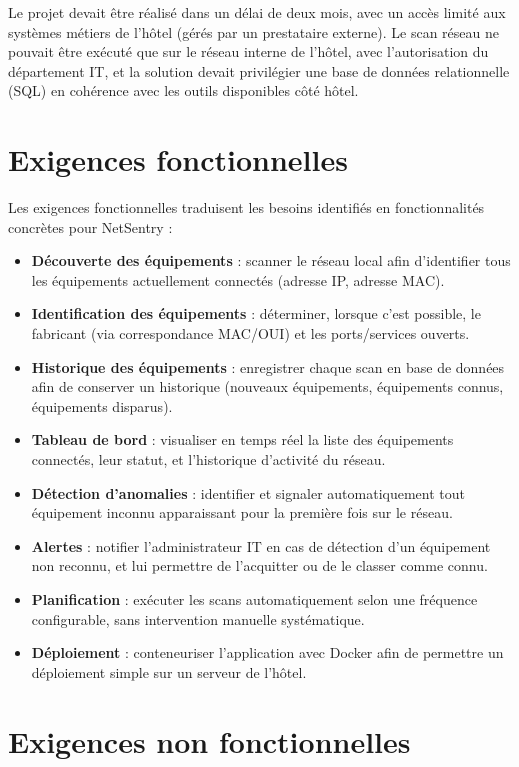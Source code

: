 Le projet devait être réalisé dans un délai de deux mois, avec un accès limité aux
systèmes métiers de l'hôtel (gérés par un prestataire externe). Le scan réseau ne
pouvait être exécuté que sur le réseau interne de l'hôtel, avec l'autorisation du
département IT, et la solution devait privilégier une base de données relationnelle
(SQL) en cohérence avec les outils disponibles côté hôtel.

\section{Exigences fonctionnelles}

Les exigences fonctionnelles traduisent les besoins identifiés en fonctionnalités
concrètes pour NetSentry :

\begin{itemize}
    \item \textbf{Découverte des équipements} : scanner le réseau local afin
    d'identifier tous les équipements actuellement connectés (adresse IP, adresse MAC).
    \item \textbf{Identification des équipements} : déterminer, lorsque c'est possible,
    le fabricant (via correspondance MAC/OUI) et les ports/services ouverts.
    \item \textbf{Historique des équipements} : enregistrer chaque scan en base de
    données afin de conserver un historique (nouveaux équipements, équipements connus,
    équipements disparus).
    \item \textbf{Tableau de bord} : visualiser en temps réel la liste des équipements
    connectés, leur statut, et l'historique d'activité du réseau.
    \item \textbf{Détection d'anomalies} : identifier et signaler automatiquement tout
    équipement inconnu apparaissant pour la première fois sur le réseau.
    \item \textbf{Alertes} : notifier l'administrateur IT en cas de détection d'un
    équipement non reconnu, et lui permettre de l'acquitter ou de le classer comme
    connu.
    \item \textbf{Planification} : exécuter les scans automatiquement selon une
    fréquence configurable, sans intervention manuelle systématique.
    \item \textbf{Déploiement} : conteneuriser l'application avec Docker afin de
    permettre un déploiement simple sur un serveur de l'hôtel.
\end{itemize}

\section{Exigences non fonctionnelles}

